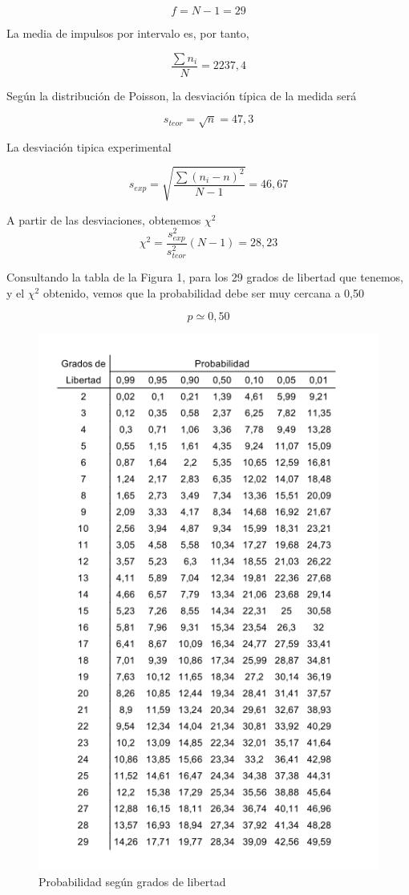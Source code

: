 \documentclass[a4paper,12pt,spanish]{article}
\begin{document}
	\[f = N - 1 = 29 		\]
	
	La media de impulsos por intervalo es, por tanto, 
	
	\[ \frac{\sum n_i}{N} = 2237,4	\]
	
	Según la distribución de Poisson, la desviación típica de la medida será
	
	\[ s_{teor} = \sqrt{n} = 47,3		\]
	
	La desviación tipica experimental
	
	\[s_{exp} = \sqrt{\frac{\sum (n_i - n)^2}{N - 1}} = 46,67			\]
	
	
	A partir de las desviaciones, obtenemos $\chi^2$	
	\[\chi^2 = \frac{s^2_{exp}}{s^2_{teor}}(N-1) = 28,23			\]
	
	
	Consultando la tabla de la Figura 1, para los 29 grados de libertad que tenemos, y el $\chi^2$ obtenido, vemos que la probabilidad debe ser muy cercana a 0,50
	
	
	
	\[p \simeq 0,50 					\]
	
	
	
	
	
	
\begin{figure}[H]
	\centering
	\includegraphics[width=0.6\linewidth]{imagenes/image.FX4PL2}
	\caption{Probabilidad según grados de libertad}
	\label{fig:chicuadrado}
\end{figure}
	
\end{document}
